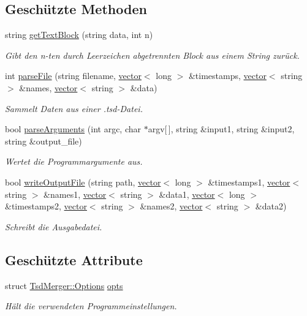 \subsection*{Geschützte Methoden}
\begin{DoxyCompactItemize}
\item 
string \hyperlink{classTsdMerger_a413e3835ebd34a810a19465525bb6cbb}{get\-Text\-Block} (string data, int n)
\begin{DoxyCompactList}\small\item\em Gibt den n-\/ten durch Leerzeichen abgetrennten Block aus einem String zurück. \end{DoxyCompactList}\item 
int \hyperlink{classTsdMerger_aed81153be336c48a43e2663e39fa341d}{parse\-File} (string filename, \hyperlink{classstd_1_1vector}{vector}$<$ long $>$ \&timestamps, \hyperlink{classstd_1_1vector}{vector}$<$ string $>$ \&names, \hyperlink{classstd_1_1vector}{vector}$<$ string $>$ \&data)
\begin{DoxyCompactList}\small\item\em Sammelt Daten aus einer .tsd-\/\-Datei. \end{DoxyCompactList}\item 
bool \hyperlink{classTsdMerger_a28edc421a3ee073b63448740fe1184ea}{parse\-Arguments} (int argc, char $\ast$argv\mbox{[}$\,$\mbox{]}, string \&input1, string \&input2, string \&output\-\_\-file)
\begin{DoxyCompactList}\small\item\em Wertet die Programmargumente aus. \end{DoxyCompactList}\item 
bool \hyperlink{classTsdMerger_af88a04f92aed868a58740f5d9ecd2eda}{write\-Output\-File} (string path, \hyperlink{classstd_1_1vector}{vector}$<$ long $>$ \&timestamps1, \hyperlink{classstd_1_1vector}{vector}$<$ string $>$ \&names1, \hyperlink{classstd_1_1vector}{vector}$<$ string $>$ \&data1, \hyperlink{classstd_1_1vector}{vector}$<$ long $>$ \&timestamps2, \hyperlink{classstd_1_1vector}{vector}$<$ string $>$ \&names2, \hyperlink{classstd_1_1vector}{vector}$<$ string $>$ \&data2)
\begin{DoxyCompactList}\small\item\em Schreibt die Ausgabedatei. \end{DoxyCompactList}\end{DoxyCompactItemize}
\subsection*{Geschützte Attribute}
\begin{DoxyCompactItemize}
\item 
struct \hyperlink{structTsdMerger_1_1Options}{Tsd\-Merger\-::\-Options} \hyperlink{classTsdMerger_a974c4c249c8a33dd1030bb0c83a94afc}{opts}
\begin{DoxyCompactList}\small\item\em Hält die verwendeten Programmeinstellungen. \end{DoxyCompactList}\end{DoxyCompactItemize}


